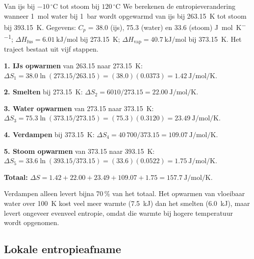 \begin{voorbeeld}{Van ijs bij $-10\,^\circ$C tot stoom bij $120\,^\circ$C}
We berekenen de entropieverandering wanneer \SI{1}{\mole} water bij \SI{1}{\bar} wordt opgewarmd van ijs bij \SI{263.15}{\kelvin} tot stoom bij \SI{393.15}{\kelvin}. Gegevens: $C_p$ = 38.0 (ijs), 75.3 (water) en 33.6 (stoom) \si{\joule\per\mole\per\kelvin}; $\Delta H_\text{fus} = \SI{6.01}{\kilo\joule\per\mole}$ bij \SI{273.15}{\kelvin}; $\Delta H_\text{vap} = \SI{40.7}{\kilo\joule\per\mole}$ bij \SI{373.15}{\kelvin}. Het traject bestaat uit vijf stappen.

\textbf{1. IJs opwarmen} van 263.15 naar \SI{273.15}{\kelvin}: $\Delta S_1 = 38.0\ln(273.15/263.15) = (38.0)(0.0373) = \SI{1.42}{\joule\per\mole\per\kelvin}$.

\textbf{2. Smelten} bij \SI{273.15}{\kelvin}: $\Delta S_2 = 6010/273.15 = \SI{22.00}{\joule\per\mole\per\kelvin}$.

\textbf{3. Water opwarmen} van 273.15 naar \SI{373.15}{\kelvin}: $\Delta S_3 = 75.3\ln(373.15/273.15) = (75.3)(0.3120) = \SI{23.49}{\joule\per\mole\per\kelvin}$.

\textbf{4. Verdampen} bij \SI{373.15}{\kelvin}: $\Delta S_4 = 40\,700/373.15 = \SI{109.07}{\joule\per\mole\per\kelvin}$.

\textbf{5. Stoom opwarmen} van 373.15 naar \SI{393.15}{\kelvin}: $\Delta S_5 = 33.6\ln(393.15/373.15) = (33.6)(0.0522) = \SI{1.75}{\joule\per\mole\per\kelvin}$.

\textbf{Totaal:} $\Delta S = 1.42 + 22.00 + 23.49 + 109.07 + 1.75 = \SI{157.7}{\joule\per\mole\per\kelvin}$.

Verdampen alleen levert bijna 70\,\% van het totaal. Het opwarmen van vloeibaar water over \SI{100}{\kelvin} kost veel meer warmte (\SI{7.5}{\kilo\joule}) dan het smelten (\SI{6.0}{\kilo\joule}), maar levert ongeveer evenveel entropie, omdat die warmte bij hogere temperatuur wordt opgenomen.
\end{voorbeeld}

\subsection{Lokale entropieafname}


